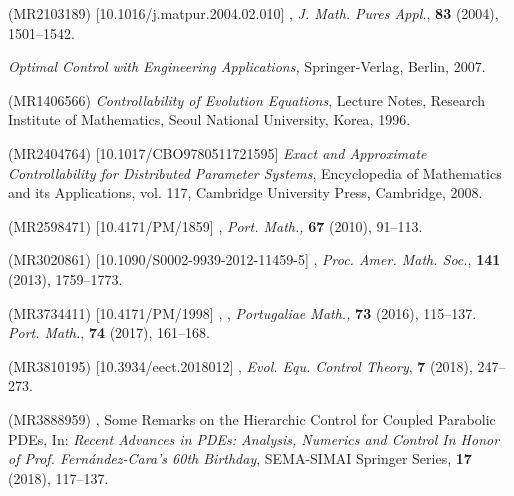 \documentclass{dcds-bOF}
\theoremstyle{definition}
\begin{document}
\begin{thebibliography}{99}
 (MR2103189) [10.1016/j.matpur.2004.02.010]
\newblock {},
\newblock \emph{J. Math. Pures Appl.}, \textbf{83} (2004), 1501--1542.

\newblock \emph{Optimal Control with Engineering Applications,}
\newblock Springer-Verlag, Berlin, 2007.

 (MR1406566)
\newblock \emph{Controllability of Evolution Equations},
\newblock Lecture Notes, Research Institute of Mathematics, Seoul National University, Korea, 1996.

 (MR2404764) [10.1017/CBO9780511721595]
\newblock \emph{Exact and Approximate Controllability for Distributed Parameter Systems},
\newblock Encyclopedia of Mathematics and its Applications, vol. 117, Cambridge University Press, Cambridge, 2008.

 (MR2598471) [10.4171/PM/1859]
\newblock {},
\newblock \emph{Port. Math.,} \textbf{67} (2010), 91--113.

 (MR3020861) [10.1090/S0002-9939-2012-11459-5]
\newblock {},
\newblock \emph{Proc. Amer. Math. Soc.}, \textbf{141} (2013), 1759--1773.

 (MR3734411) [10.4171/PM/1998]
,
\newblock {}, \emph{Portugaliae Math.,} \textbf{73} (2016), 115--137.
\newblock \emph{Port. Math.}, \textbf{74} (2017),  161--168.

 (MR3810195) [10.3934/eect.2018012]
\newblock {},
\newblock \emph{Evol. Equ. Control Theory}, \textbf{7} (2018), 247--273.

 (MR3888959)
,
\newblock Some Remarks on the Hierarchic Control for Coupled Parabolic PDEs,
\newblock In: \emph{Recent Advances in PDEs: Analysis, Numerics and Control In Honor of Prof. Fern\'andez-Cara's 60th Birthday}, SEMA-SIMAI Springer Series, \textbf{17} (2018), 117--137.


\end{thebibliography}
\end{document}
